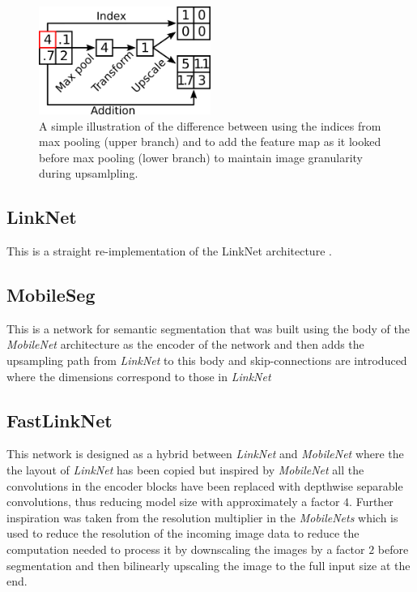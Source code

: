 \documentclass{kththesis}
\begin{document}
\begin{figure}[h]
  \centering
  \includegraphics[width=0.5\textwidth]{upscale}
  \caption{A simple illustration of the difference between using the indices
    from max pooling (upper branch) and to add the feature map as it looked
    before max pooling (lower branch)
    to maintain image granularity during upsamlpling.}
  \label{fig:upscale}
\end{figure}

\subsection*{LinkNet}
This is a straight re-implementation of the LinkNet architecture \parencite{chaurasia2017linknet}.

\subsection*{MobileSeg}
This is a network for semantic segmentation that was built using the body of the
\textit{MobileNet} architecture \parencite{howard2017mobilenets} as the encoder of the network and then adds the
upsampling path from \textit{LinkNet} to this body and skip-connections are
introduced where the dimensions correspond to those in \textit{LinkNet}

\subsection*{FastLinkNet}
This network is designed as a hybrid between \textit{LinkNet} and
\textit{MobileNet} where the the layout of \textit{LinkNet} has been copied but
inspired by \textit{MobileNet} all the convolutions in the encoder blocks have
been replaced with depthwise separable convolutions, thus reducing model size
with approximately a factor \(4\).
Further inspiration was taken from the resolution
multiplier in the \textit{MobileNets} which is used to reduce the resolution of
the incoming image data to reduce the computation needed to process it by
downscaling the images by a factor \(2\) before segmentation and then bilinearly
upscaling the image to the full input size at the end.
\end{document}
